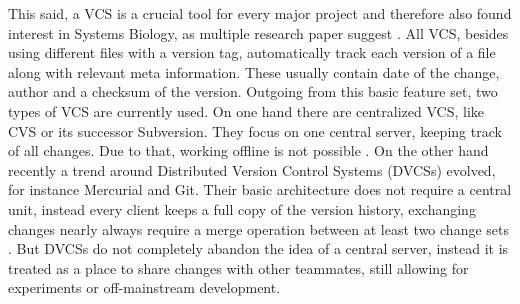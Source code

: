 	This said, a VCS is a crucial tool for every major project and therefore also found interest in Systems Biology, as multiple research paper suggest \citep{Waltemath2013,Beard2009,Hucka2003,Li2010,Miller2011}.
	All VCS, besides using different files with a version tag, automatically track each version of a file along with relevant meta information. These usually contain date of the change, author and a checksum of the version.
	Outgoing from this basic feature set, two types of VCS are currently used. On one hand there are centralized VCS, like CVS or its successor Subversion. They focus on one central server, keeping track of all changes. Due to that, working offline is not possible \citep{Collins-Sussman2004}.
	On the other hand recently a trend around Distributed Version Control Systems (DVCSs) evolved, for instance Mercurial and Git. Their basic architecture does not require a central unit, instead every client keeps a full copy of the version history, exchanging changes nearly always require a merge operation between at least two change sets \citep{OSullivan2009}.
	But DVCSs do not completely abandon the idea of a central server, instead it is treated as a place to share changes with other teammates, still allowing for experiments or off-mainstream development.
	

		
